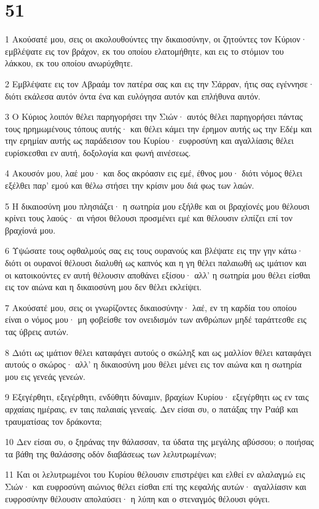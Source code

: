\chapter{51}

\par 1 Ακούσατέ μου, σεις οι ακολουθούντες την δικαιοσύνην, οι ζητούντες τον Κύριον· εμβλέψατε εις τον βράχον, εκ του οποίου ελατομήθητε, και εις το στόμιον του λάκκου, εκ του οποίου ανωρύχθητε.
\par 2 Εμβλέψατε εις τον Αβραάμ τον πατέρα σας και εις την Σάρραν, ήτις σας εγέννησε· διότι εκάλεσα αυτόν όντα ένα και ευλόγησα αυτόν και επλήθυνα αυτόν.
\par 3 Ο Κύριος λοιπόν θέλει παρηγορήσει την Σιών· αυτός θέλει παρηγορήσει πάντας τους ηρημωμένους τόπους αυτής· και θέλει κάμει την έρημον αυτής ως την Εδέμ και την ερημίαν αυτής ως παράδεισον του Κυρίου· ευφροσύνη και αγαλλίασις θέλει ευρίσκεσθαι εν αυτή, δοξολογία και φωνή αινέσεως.
\par 4 Ακουσόν μου, λαέ μου· και δος ακρόασιν εις εμέ, έθνος μου· διότι νόμος θέλει εξέλθει παρ' εμού και θέλω στήσει την κρίσιν μου διά φως των λαών.
\par 5 Η δικαιοσύνη μου πλησιάζει· η σωτηρία μου εξήλθε και οι βραχίονές μου θέλουσι κρίνει τους λαούς· αι νήσοι θέλουσι προσμένει εμέ και θέλουσιν ελπίζει επί τον βραχίονά μου.
\par 6 Υψώσατε τους οφθαλμούς σας εις τους ουρανούς και βλέψατε εις την γην κάτω· διότι οι ουρανοί θέλουσι διαλυθή ως καπνός και η γη θέλει παλαιωθή ως ιμάτιον και οι κατοικούντες εν αυτή θέλουσιν αποθάνει εξίσου· αλλ' η σωτηρία μου θέλει είσθαι εις τον αιώνα και η δικαιοσύνη μου δεν θέλει εκλείψει.
\par 7 Ακούσατέ μου, σεις οι γνωρίζοντες δικαιοσύνην· λαέ, εν τη καρδία του οποίου είναι ο νόμος μου· μη φοβείσθε τον ονειδισμόν των ανθρώπων μηδέ ταράττεσθε εις τας ύβρεις αυτών.
\par 8 Διότι ως ιμάτιον θέλει καταφάγει αυτούς ο σκώληξ και ως μαλλίον θέλει καταφάγει αυτούς ο σκώρος· αλλ' η δικαιοσύνη μου θέλει μένει εις τον αιώνα και η σωτηρία μου εις γενεάς γενεών.
\par 9 Εξεγέρθητι, εξεγέρθητι, ενδύθητι δύναμιν, βραχίων Κυρίου· εξεγέρθητι ως εν ταις αρχαίαις ημέραις, εν ταις παλαιαίς γενεαίς. Δεν είσαι συ, ο πατάξας την Ραάβ και τραυματίσας τον δράκοντα;
\par 10 Δεν είσαι συ, ο ξηράνας την θάλασσαν, τα ύδατα της μεγάλης αβύσσου; ο ποιήσας τα βάθη της θαλάσσης οδόν διαβάσεως των λελυτρωμένων;
\par 11 Και οι λελυτρωμένοι του Κυρίου θέλουσιν επιστρέψει και ελθεί εν αλαλαγμώ εις Σιών· και ευφροσύνη αιώνιος θέλει είσθαι επί της κεφαλής αυτών· αγαλλίασιν και ευφροσύνην θέλουσιν απολαύσει· η λύπη και ο στεναγμός θέλουσι φύγει.
